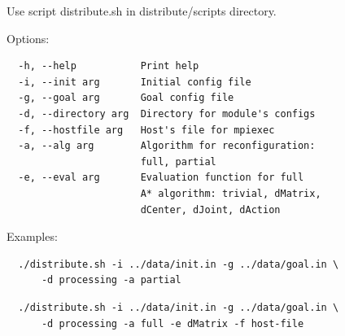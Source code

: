 \documentclass[
  digital, %
  oneside, %
  notable,   %
  lof,     %
  nolot,     %
]{fithesis3}
\begin{document}
Use script distribute.sh in distribute/scripts directory. 

Options: 

\begin{verbatim}
  -h, --help           Print help
  -i, --init arg       Initial config file
  -g, --goal arg       Goal config file
  -d, --directory arg  Directory for module's configs
  -f, --hostfile arg   Host's file for mpiexec
  -a, --alg arg        Algorithm for reconfiguration: 
                       full, partial
  -e, --eval arg       Evaluation function for full 
                       A* algorithm: trivial, dMatrix, 
                       dCenter, dJoint, dAction
\end{verbatim}

Examples:

\begin{verbatim}
  ./distribute.sh -i ../data/init.in -g ../data/goal.in \
      -d processing -a partial
\end{verbatim}

\begin{verbatim}
  ./distribute.sh -i ../data/init.in -g ../data/goal.in \
      -d processing -a full -e dMatrix -f host-file
\end{verbatim}




\printbibliography[heading=bibintoc] %
\end{document}
